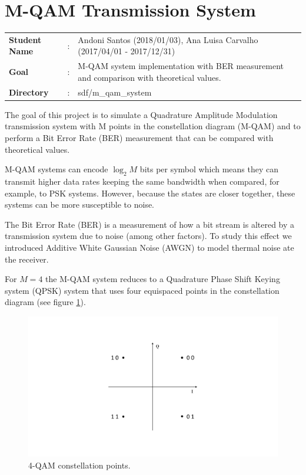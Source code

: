 \clearpage
\section{M-QAM Transmission System}

\begin{tcolorbox}	
	\begin{tabular}{p{2.75cm} p{0.2cm} p{10.5cm}} 	
		\textbf{Student Name}  &:& Andoni Santos (2018/01/03), Ana Luisa Carvalho (2017/04/01 - 2017/12/31) \\
		\textbf{Goal}          &:& M-QAM system implementation with BER measurement and comparison with theoretical values.\\
		\textbf{Directory} &:& sdf/m\_qam\_system
	\end{tabular}
\end{tcolorbox}

The goal of this project is to simulate a Quadrature Amplitude Modulation transmission system with M points in the constellation diagram (M-QAM) and to perform a Bit Error Rate (BER) measurement that can be compared with theoretical values.

M-QAM systems can encode $\log_2 M$ bits per symbol which means they can transmit higher data rates keeping the same bandwidth when compared, for example, to PSK systems. However, because the states are closer together, these systems can be more susceptible to noise.

The Bit Error Rate (BER) is a measurement of how a bit stream is altered by a transmission system due to noise (among other factors). To study this effect we introduced Additive White Gaussian Noise (AWGN) to model thermal noise ate the receiver.

For $M=4$ the M-QAM system reduces to a Quadrature Phase Shift Keying system (QPSK) system that uses four equispaced points in the constellation diagram (see figure \ref{fig:const}).

\begin{figure}[h]
	\centering
	\includegraphics[clip, trim=1cm 3cm 1cm 3cm, width=\textwidth]{./sdf/m_qam_system/figures/MQAM_constellation.pdf}
	\caption{4-QAM constellation points.}
	\label{fig:const}
\end{figure}

